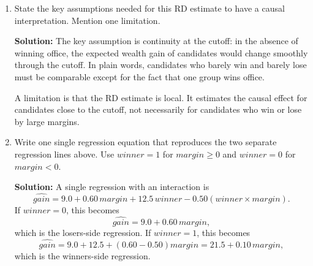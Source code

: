 \documentclass[11pt]{exam}
\begin{document}
\begin{questions}
\begin{enumerate}[leftmargin = 0.5cm, label = (\alph*), rightmargin = 0.2cm]
    \item State the key assumptions needed for this RD estimate to have a causal interpretation. Mention one limitation.

    \begin{solutionorbox}[6cm]
    \textbf{Solution:} The key assumption is continuity at the cutoff: in the absence of winning office, the expected wealth gain of candidates would change smoothly through the cutoff. In plain words, candidates who barely win and barely lose must be comparable except for the fact that one group wins office.

    A limitation is that the RD estimate is local. It estimates the causal effect for candidates close to the cutoff, not necessarily for candidates who win or lose by large margins.
    \end{solutionorbox}

    \item Write one single regression equation that reproduces the two separate regression lines above. Use $winner=1$ for $margin\geq 0$ and $winner=0$ for $margin<0$.

    \begin{solutionorbox}[5.5cm]
    \textbf{Solution:} A single regression with an interaction is
    \[
    \widehat{gain}=9.0+0.60\,margin+12.5\,winner-0.50(winner\times margin).
    \]
    If $winner=0$, this becomes
    \[
    \widehat{gain}=9.0+0.60\,margin,
    \]
    which is the losers-side regression. If $winner=1$, this becomes
    \[
    \widehat{gain}=9.0+12.5+(0.60-0.50)margin=21.5+0.10\,margin,
    \]
    which is the winners-side regression.
    \end{solutionorbox}
\end{enumerate}

\end{questions}
\end{document}
